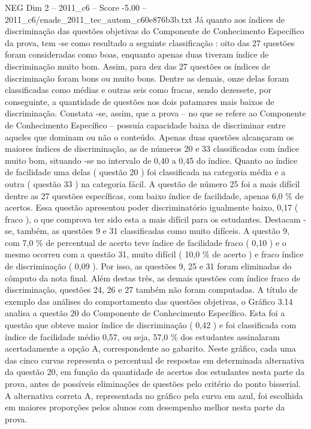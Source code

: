 \begin{textsample}{NEG Dim 2 – 2011\_c6 – Score -5.00 – 2011\_c6/enade\_2011\_tec\_autom\_c60e876b3b.txt}
Já quanto aos índices de discriminação das questões objetivas do Componente de Conhecimento Específico da prova, tem -se como resultado a seguinte classificação : oito das 27 questões foram consideradas como boas, enquanto apenas duas tiveram índice de discriminação muito bom.
Assim, para dez das 27 questões os índices de discriminação foram bons ou muito bons.
Dentre as demais, onze delas foram classificadas como médias e outras seis como fracas, sendo dezessete, por conseguinte, a quantidade de questões nos dois patamares mais baixos de discriminação.
Constata -se, assim, que a prova – no que se refere ao Componente de Conhecimento Específico – possuía capacidade baixa de discriminar entre aqueles que dominam ou não o conteúdo.
Apenas duas questões alcançaram os maiores índices de discriminação, as de números 20 e 33 classificadas com índice muito bom, situando -se no intervalo de 0,40 a 0,45 do índice.
Quanto ao índice de facilidade uma delas ( questão 20 ) foi classificada na categoria média e a outra ( questão 33 ) na categoria fácil.
A questão de número 25 foi a mais difícil dentre as 27 questões específicas, com baixo índice de facilidade, apenas 6,0 \% de acertos.
Essa questão apresentou poder discriminatório igualmente baixo, 0,17 ( fraco ), o que comprova ter sido esta a mais difícil para os estudantes.
Destacam -se, também, as questões 9 e 31 classificadas como muito difíceis.
A questão 9, com 7,0 \% de percentual de acerto teve índice de facilidade fraco ( 0,10 ) e o mesmo ocorreu com a questão 31, muito difícil ( 10,0 \% de acerto ) e fraco índice de discriminação ( 0,09 ).
Por isso, as questões 9, 25 e 31 foram eliminadas do cômputo da nota final.
Além destas três, as demais questões com índice fraco de discriminação, questões 24, 26 e 27 também não foram computadas.
A título de exemplo das análises do comportamento das questões objetivas, o Gráfico 3.14 analisa a questão 20 do Componente de Conhecimento Específico.
Esta foi a questão que obteve maior índice de discriminação ( 0,42 ) e foi classificada com índice de facilidade médio 0,57, ou seja, 57,0 \% dos estudantes assinalaram acertadamente a opção A, correspondente ao gabarito.
Neste gráfico, cada uma das cinco curvas representa o percentual de respostas em determinada alternativa da questão 20, em função da quantidade de acertos dos estudantes nesta parte da prova, antes de possíveis eliminações de questões pelo critério do ponto bisserial.
A alternativa correta A, representada no gráfico pela curva em azul, foi escolhida em maiores proporções pelos alunos com desempenho melhor nesta parte da prova.

\end{textsample}
